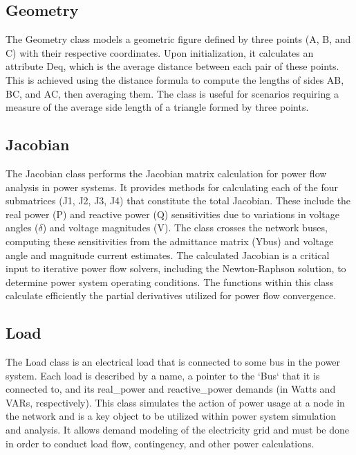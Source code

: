 \documentclass{article}
\begin{document}
	\subsection{Geometry}
	The Geometry class models a geometric figure defined by three points (A, B, and C) with their respective coordinates. Upon initialization, it calculates an attribute Deq, which is the average distance between each pair of these points. This is achieved using the distance formula to compute the lengths of sides AB, BC, and AC, then averaging them. The class is useful for scenarios requiring a measure of the average side length of a triangle formed by three points.
	
	\subsection{Jacobian}
	The Jacobian class performs the Jacobian matrix calculation for power flow analysis in power systems. It provides methods for calculating each of the four submatrices (J1, J2, J3, J4) that constitute the total Jacobian. These include the real power (P) and reactive power (Q) sensitivities due to variations in voltage angles ($\delta$) and voltage magnitudes (V). The class crosses the network buses, computing these sensitivities from the admittance matrix (Ybus) and voltage angle and magnitude current estimates. The calculated Jacobian is a critical input to iterative power flow solvers, including the Newton-Raphson solution, to determine power system operating conditions. The functions within this class calculate efficiently the partial derivatives utilized for power flow convergence.
	
	\subsection{Load}
	The Load class is an electrical load that is connected to some bus in the power system. Each load is described by a name, a pointer to the `Bus` that it is connected to, and its real\_power and reactive\_power demands (in Watts and VARs, respectively). This class simulates the action of power usage at a node in the network and is a key object to be utilized within power system simulation and analysis. It allows demand modeling of the electricity grid and must be done in order to conduct load flow, contingency, and other power calculations.
	
\end{document}
